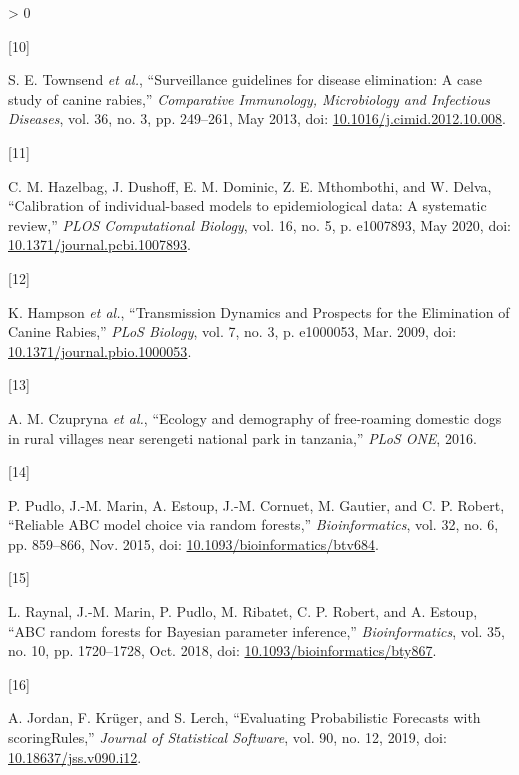 \documentclass[
  oneside]{book}
\newlength{\cslhangindent}
\newlength{\csllabelwidth}
\newenvironment{CSLReferences}[2] %
 {%
  \setlength{\parindent}{0pt}
  \ifodd #1 \everypar{\setlength{\hangindent}{\cslhangindent}}\ignorespaces\fi
  \ifnum #2 > 0
  \setlength{\parskip}{#2\baselineskip}
  \fi
 }%
 {}
\newcommand{\CSLLeftMargin}[1]{\parbox[t]{\csllabelwidth}{#1}}
\newcommand{\CSLRightInline}[1]{\parbox[t]{\linewidth - \csllabelwidth}{#1}\break}
\begin{document}
\begin{CSLReferences}{0}{0}
\leavevmode\hypertarget{ref-townsend2013a}{}%
\CSLLeftMargin{{[}10{]} }
\CSLRightInline{S. E. Townsend \emph{et al.}, {``Surveillance guidelines for disease elimination: A case study of canine rabies,''} \emph{Comparative Immunology, Microbiology and Infectious Diseases}, vol. 36, no. 3, pp. 249--261, May 2013, doi: \href{https://doi.org/10.1016/j.cimid.2012.10.008}{10.1016/j.cimid.2012.10.008}.}

\leavevmode\hypertarget{ref-hazelbag2020}{}%
\CSLLeftMargin{{[}11{]} }
\CSLRightInline{C. M. Hazelbag, J. Dushoff, E. M. Dominic, Z. E. Mthombothi, and W. Delva, {``Calibration of individual-based models to epidemiological data: A systematic review,''} \emph{PLOS Computational Biology}, vol. 16, no. 5, p. e1007893, May 2020, doi: \href{https://doi.org/10.1371/journal.pcbi.1007893}{10.1371/journal.pcbi.1007893}.}

\leavevmode\hypertarget{ref-Hampson2009}{}%
\CSLLeftMargin{{[}12{]} }
\CSLRightInline{K. Hampson \emph{et al.}, {``Transmission Dynamics and Prospects for the Elimination of Canine Rabies,''} \emph{PLoS Biology}, vol. 7, no. 3, p. e1000053, Mar. 2009, doi: \href{https://doi.org/10.1371/journal.pbio.1000053}{10.1371/journal.pbio.1000053}.}

\leavevmode\hypertarget{ref-czupryna2016}{}%
\CSLLeftMargin{{[}13{]} }
\CSLRightInline{A. M. Czupryna \emph{et al.}, {``Ecology and demography of free-roaming domestic dogs in rural villages near serengeti national park in tanzania,''} \emph{PLoS ONE}, 2016.}

\leavevmode\hypertarget{ref-pudlo2015}{}%
\CSLLeftMargin{{[}14{]} }
\CSLRightInline{P. Pudlo, J.-M. Marin, A. Estoup, J.-M. Cornuet, M. Gautier, and C. P. Robert, {``Reliable ABC model choice via random forests,''} \emph{Bioinformatics}, vol. 32, no. 6, pp. 859--866, Nov. 2015, doi: \href{https://doi.org/10.1093/bioinformatics/btv684}{10.1093/bioinformatics/btv684}.}

\leavevmode\hypertarget{ref-raynal2018}{}%
\CSLLeftMargin{{[}15{]} }
\CSLRightInline{L. Raynal, J.-M. Marin, P. Pudlo, M. Ribatet, C. P. Robert, and A. Estoup, {``ABC random forests for Bayesian parameter inference,''} \emph{Bioinformatics}, vol. 35, no. 10, pp. 1720--1728, Oct. 2018, doi: \href{https://doi.org/10.1093/bioinformatics/bty867}{10.1093/bioinformatics/bty867}.}

\leavevmode\hypertarget{ref-jordan2019}{}%
\CSLLeftMargin{{[}16{]} }
\CSLRightInline{A. Jordan, F. Krüger, and S. Lerch, {``Evaluating Probabilistic Forecasts with scoringRules,''} \emph{Journal of Statistical Software}, vol. 90, no. 12, 2019, doi: \href{https://doi.org/10.18637/jss.v090.i12}{10.18637/jss.v090.i12}.}


\end{CSLReferences}
\end{document}
